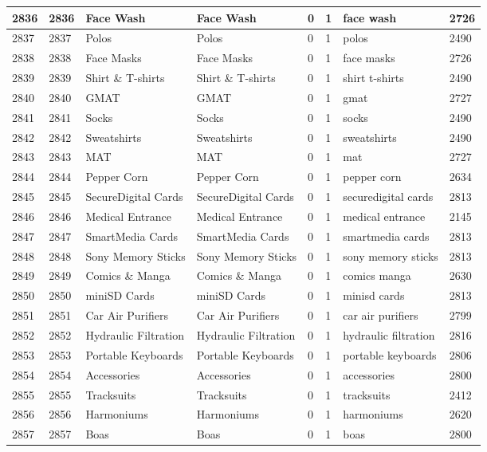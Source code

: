 \begin{longtable}{|l|l|l|l|l|l|l|l|}
2836 & 2836 & Face Wash & Face Wash & 0 & 1 & face wash & 2726 \\ \hline 
2837 & 2837 & Polos & Polos & 0 & 1 & polos & 2490 \\ \hline 
2838 & 2838 & Face Masks & Face Masks & 0 & 1 & face masks & 2726 \\ \hline 
2839 & 2839 & Shirt \& T-shirts & Shirt \& T-shirts & 0 & 1 & shirt t-shirts & 2490 \\ \hline 
2840 & 2840 & GMAT & GMAT & 0 & 1 & gmat & 2727 \\ \hline 
2841 & 2841 & Socks & Socks & 0 & 1 & socks & 2490 \\ \hline 
2842 & 2842 & Sweatshirts & Sweatshirts & 0 & 1 & sweatshirts & 2490 \\ \hline 
2843 & 2843 & MAT & MAT & 0 & 1 & mat & 2727 \\ \hline 
2844 & 2844 & Pepper Corn & Pepper Corn & 0 & 1 & pepper corn & 2634 \\ \hline 
2845 & 2845 & SecureDigital Cards & SecureDigital Cards & 0 & 1 & securedigital cards & 2813 \\ \hline 
2846 & 2846 & Medical Entrance & Medical Entrance & 0 & 1 & medical entrance & 2145 \\ \hline 
2847 & 2847 & SmartMedia Cards & SmartMedia Cards & 0 & 1 & smartmedia cards & 2813 \\ \hline 
2848 & 2848 & Sony Memory Sticks & Sony Memory Sticks & 0 & 1 & sony memory sticks & 2813 \\ \hline 
2849 & 2849 & Comics \& Manga & Comics \& Manga & 0 & 1 & comics manga & 2630 \\ \hline 
2850 & 2850 & miniSD Cards & miniSD Cards & 0 & 1 & minisd cards & 2813 \\ \hline 
2851 & 2851 & Car Air Purifiers & Car Air Purifiers & 0 & 1 & car air purifiers & 2799 \\ \hline 
2852 & 2852 & Hydraulic Filtration & Hydraulic Filtration & 0 & 1 & hydraulic filtration & 2816 \\ \hline 
2853 & 2853 & Portable Keyboards & Portable Keyboards & 0 & 1 & portable keyboards & 2806 \\ \hline 
2854 & 2854 & Accessories & Accessories & 0 & 1 & accessories & 2800 \\ \hline 
2855 & 2855 & Tracksuits & Tracksuits & 0 & 1 & tracksuits & 2412 \\ \hline 
2856 & 2856 & Harmoniums & Harmoniums & 0 & 1 & harmoniums & 2620 \\ \hline 
2857 & 2857 & Boas & Boas & 0 & 1 & boas & 2800 \\ \hline 

\end{longtable}
